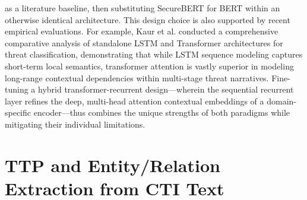\documentclass[12pt,a4paper]{report}
\begin{document}
\cite{hidayatulloh2026hybrid}
as a literature baseline, then substituting SecureBERT for BERT within
an otherwise identical architecture. This design choice is also
supported by recent empirical evaluations. For example, Kaur et al.
\cite{kaur2024comparison}
conducted a comprehensive comparative analysis of standalone LSTM and
Transformer architectures for threat classification, demonstrating that
while LSTM sequence modeling captures short-term local semantics,
transformer attention is vastly superior in modeling long-range
contextual dependencies within multi-stage threat narratives.
Fine-tuning a hybrid transformer-recurrent design---wherein the
sequential recurrent layer refines the deep, multi-head attention
contextual embeddings of a domain-specific encoder---thus combines the
unique strengths of both paradigms while mitigating their individual
limitations.

\section{TTP and Entity/Relation Extraction from CTI Text}
\end{document}
